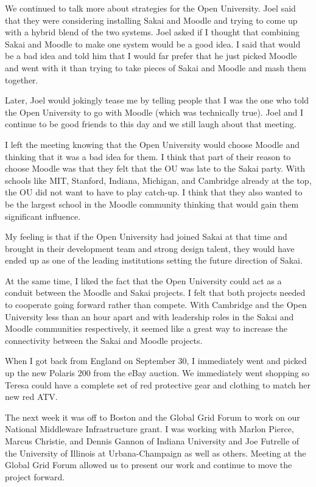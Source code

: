 \documentclass[12pt]{book}
\begin{document}
We continued to talk more about strategies
for the Open University.  Joel said that they
were considering installing Sakai and Moodle
and trying to come up with a hybrid blend of
the two systems.  Joel asked if I thought
that combining Sakai and Moodle to make one system
would be a good idea.  I said that would be a bad
idea and told him that I would far prefer that
he just picked Moodle and went with it
than trying to take pieces of Sakai and
Moodle and mash them together.

Later, Joel would jokingly tease me by telling
people that I was the one who told the Open
University to go with Moodle (which was
technically true).  Joel and I
continue to be good friends to this day and
we still laugh about that meeting.

I left the meeting knowing that the Open
University would choose Moodle and thinking
that it was a bad idea for them.
I think that part of their reason
to choose Moodle
was that they felt that the OU was late to
the Sakai party. With schools like
MIT, Stanford, Indiana, Michigan, and Cambridge
already at the top, the OU did not want
to have to play catch-up.  I think that
they also wanted to be the largest school in
the Moodle community thinking that would gain them
significant influence.

My feeling is that if the Open University
had joined Sakai at that time and brought
in their development team and strong
design talent, they would have ended up as
one of the leading institutions setting the
future direction of Sakai.

At the same time, I liked the fact that
the Open University could act as a conduit
between the Moodle and Sakai projects.
I felt that both projects needed to cooperate
going forward rather than compete.
With Cambridge and the Open University
less than an hour apart and with leadership
roles in the Sakai and Moodle
communities respectively, it
seemed like a great way to increase the
connectivity between the Sakai and Moodle
projects.

When I got back from England on September 30,
I immediately went and picked up the new
Polaris 200 from the eBay auction.  We immediately
went shopping so Teresa could have a complete set
of red protective gear and clothing to match
her new red ATV.

The next week it was off to Boston and the Global
Grid Forum to work on our National Middleware
Infrastructure grant.  I was working with Marlon
Pierce, Marcus Christie, and Dennis Gannon of
Indiana University and Joe Futrelle of the University
of Illinois at Urbana-Champaign as well as others.
Meeting at the Global Grid Forum allowed us to present
our work and continue to move the project forward.
\end{document}
